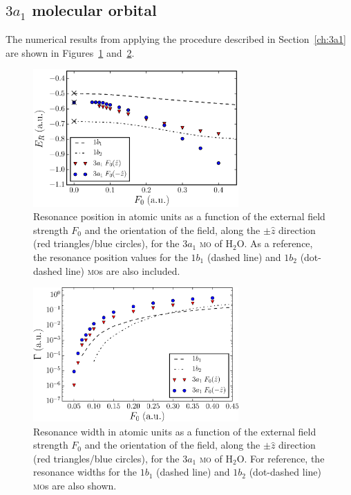 \subsection{$3a_{1}$ molecular orbital}
\label{ch:3a1_results}

The numerical results from applying the procedure described in
Section~\ref{ch:3a1} are shown in Figures~\ref{fig:3a1_position}
and~\ref{fig:3a1_width}.

\begin{figure}
  \centering
  \includegraphics[width=0.7\textwidth]{figures/ch_H2O/3a1/resPosvsForbitals_compf32snew.eps}
  \caption{Resonance position in atomic units as a function of the
    external field strength $F_{0}$ and the orientation of the field,
    along the $\pm\hat{z}$ direction (red triangles/blue circles), for
    the $3a_{1}$ \textsc{mo} of H$_{2}$O. As a reference, the resonance
    position values for the $1b_{1}$ (dashed line) and $1b_{2}$
    (dot-dashed line) \textsc{mo}s are also included.}
  \label{fig:3a1_position}
\end{figure}

\begin{figure}
  \centering
  \includegraphics[width=0.7\textwidth]{figures/ch_H2O/3a1/resWidthvsForbitals_compf32snew.eps}
  \caption{Resonance width in atomic units as a function of the
    external field strength $F_{0}$ and the orientation of the field,
    along the $\pm\hat{z}$ direction (red triangles/blue circles), for
    the $3a_{1}$ \textsc{mo} of H$_{2}$O. For reference, the resonance
    widths for the $1b_{1}$ (dashed line) and $1b_{2}$ (dot-dashed
    line) \textsc{mo}s are also shown.}
  \label{fig:3a1_width}
\end{figure}

